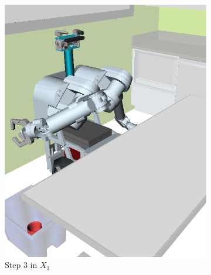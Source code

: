 {\begin{figure}
\begin{widepage}
\begin{subfigure}[t]{0.19\linewidth}
      \includegraphics[width=\columnwidth]{figs/testherb-d.png}
      \caption{Step 3 in $X_3$}
   \end{subfigure}
   \begin{subfigure}[t]{0.19\linewidth}
      \centering

\end{subfigure}
\end{widepage}
\end{figure}}
